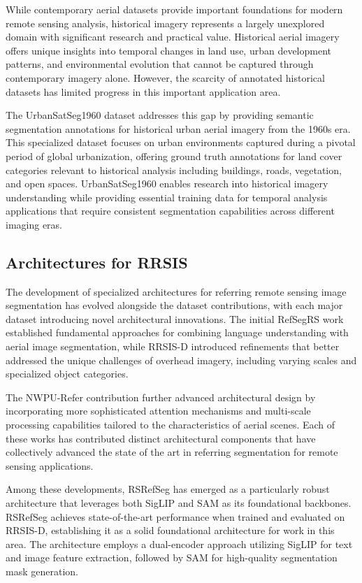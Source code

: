 While contemporary aerial datasets provide important foundations for modern remote sensing analysis, historical imagery represents a largely unexplored domain with significant research and practical value. Historical aerial imagery offers unique insights into temporal changes in land use, urban development patterns, and environmental evolution that cannot be captured through contemporary imagery alone. However, the scarcity of annotated historical datasets has limited progress in this important application area.

The UrbanSatSeg1960 dataset addresses this gap by providing semantic segmentation annotations for historical urban aerial imagery from the 1960s era. This specialized dataset focuses on urban environments captured during a pivotal period of global urbanization, offering ground truth annotations for land cover categories relevant to historical analysis including buildings, roads, vegetation, and open spaces. UrbanSatSeg1960 enables research into historical imagery understanding while providing essential training data for temporal analysis applications that require consistent segmentation capabilities across different imaging eras.

\subsection{Architectures for RRSIS}

The development of specialized architectures for referring remote sensing image segmentation has evolved alongside the dataset contributions, with each major dataset introducing novel architectural innovations. The initial RefSegRS work established fundamental approaches for combining language understanding with aerial image segmentation, while RRSIS-D introduced refinements that better addressed the unique challenges of overhead imagery, including varying scales and specialized object categories.

The NWPU-Refer contribution further advanced architectural design by incorporating more sophisticated attention mechanisms and multi-scale processing capabilities tailored to the characteristics of aerial scenes. Each of these works has contributed distinct architectural components that have collectively advanced the state of the art in referring segmentation for remote sensing applications.

Among these developments, RSRefSeg has emerged as a particularly robust architecture that leverages both SigLIP and SAM as its foundational backbones. RSRefSeg achieves state-of-the-art performance when trained and evaluated on RRSIS-D, establishing it as a solid foundational architecture for work in this area. The architecture employs a dual-encoder approach utilizing SigLIP for text and image feature extraction, followed by SAM for high-quality segmentation mask generation.

